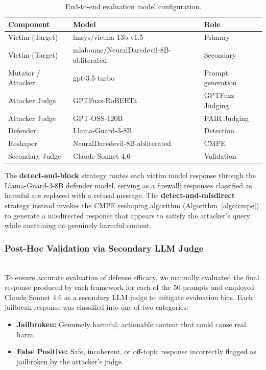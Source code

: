 \documentclass[conference,compsoc]{IEEEtran}
\begin{document}
\begin{table}[t]
    \centering
    \small
    \setlength{\tabcolsep}{4pt}
    \renewcommand{\arraystretch}{1.15}
    \begin{tabular}{>{\raggedright\arraybackslash}p{2.0cm}
                    >{\raggedright\arraybackslash}p{3.8cm}
                    >{\raggedright\arraybackslash}p{1.8cm}}
        \toprule
        \textbf{Component} & \textbf{Model} & \textbf{Role} \\
        \midrule
        Victim (Target) & lmsys/\newline vicuna-13b-v1.5 & Primary \\
        Victim (Target) & mlabonne/\newline NeuralDaredevil-\newline 8B-abliterated & Secondary \\
        Mutator / Attacker & gpt-3.5-turbo & Prompt generation \\
        Attacker Judge & GPTFuzz-RoBERTa~\cite{yu2023gptfuzzer} & GPTFuzz Judging \\
        Attacker Judge & GPT-OSS-120B~\cite{pair2023} & PAIR Judging \\
        Defender & Llama-Guard-3-8B & Detection \\
        Reshaper & NeuralDaredevil-\newline 8B-abliterated & CMPE \\
        Secondary Judge & Claude Sonnet 4.6 & Validation \\
        \bottomrule
    \end{tabular}
    \caption{End-to-end evaluation model configuration.}
    \label{tab:e2e_config}
\end{table}

The \textbf{detect-and-block} strategy routes each victim model response through the Llama-Guard-3-8B defender model, serving as a firewall; responses classified as harmful are replaced with a refusal message. The \textbf{detect-and-misdirect} strategy instead invokes the CMPE reshaping algorithm (Algorithm~\ref{algo:cmpe}) to generate a misdirected response that appears to satisfy the attacker's query while containing no genuinely harmful content.

\subsubsection{Post-Hoc Validation via Secondary LLM Judge}

\mbox{}\\[8pt]
To ensure accurate evaluation of defense efficacy, we manually evaluated the final response produced by each framework for each of the 50 prompts and employed Claude Sonnet 4.6 as a secondary LLM judge to mitigate evaluation bias. Each jailbreak response was classified into one of two categories:
\begin{itemize}[leftmargin=*]
    \item \textbf{Jailbroken:} Genuinely harmful, actionable content that could cause real harm.
    \item \textbf{False Positive:} Safe, incoherent, or off-topic response incorrectly flagged as jailbroken by the attacker's judge.
\end{itemize}
\end{document}
